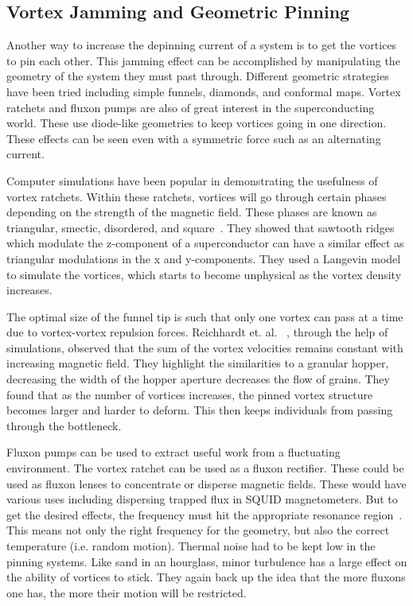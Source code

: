 \subsection{Vortex Jamming and Geometric Pinning}
Another way to increase the depinning current of a system is to get the vortices to pin each other. This jamming effect can be accomplished by manipulating the geometry of the system they must past through. Different geometric strategies have been tried including simple funnels, diamonds, and conformal maps. Vortex ratchets and fluxon pumps are also of great interest in the superconducting world. These use diode-like geometries to keep vortices going in one direction. These effects can be seen even with a symmetric force such as an alternating current.  

Computer simulations have been popular in demonstrating the usefulness of vortex ratchets. Within these ratchets, vortices will go through certain phases depending on the strength of the magnetic field. These phases are known as triangular, smectic, disordered, and square~\cite{Lu06}. They showed that sawtooth ridges which modulate the z-component of a superconductor can have a similar effect as triangular modulations in the x and y-components. They used a Langevin model to simulate the vortices, which starts to become unphysical as the vortex density increases.  

The optimal size of the funnel tip is such that only one vortex can pass at a time due to vortex-vortex repulsion forces. Reichhardt et. al.~\cite{Reichhardt10} , through the help of simulations, observed that the sum of the vortex velocities remains constant with increasing magnetic field. They highlight the similarities to a granular hopper, decreasing the width of the hopper aperture decreases the flow of grains. They found that as the number of vortices increases, the pinned vortex structure becomes larger and harder to deform. This then keeps individuals from passing through the bottleneck.

Fluxon pumps can be used to extract useful work from a fluctuating environment. The vortex ratchet can be used as a fluxon rectifier. These could be used as fluxon lenses to concentrate or disperse magnetic fields. These would have various uses including dispersing trapped flux in SQUID magnetometers. But to get the desired effects, the frequency must hit the appropriate resonance region~\cite{Wambaugh99}. This means not only the right frequency for the geometry, but also the correct temperature (i.e. random motion). Thermal noise had to be kept low in the pinning systems. Like sand in an hourglass, minor turbulence has a large effect on the ability of vortices to stick. They again back up the idea that the more fluxons one has, the more their motion will be restricted.

